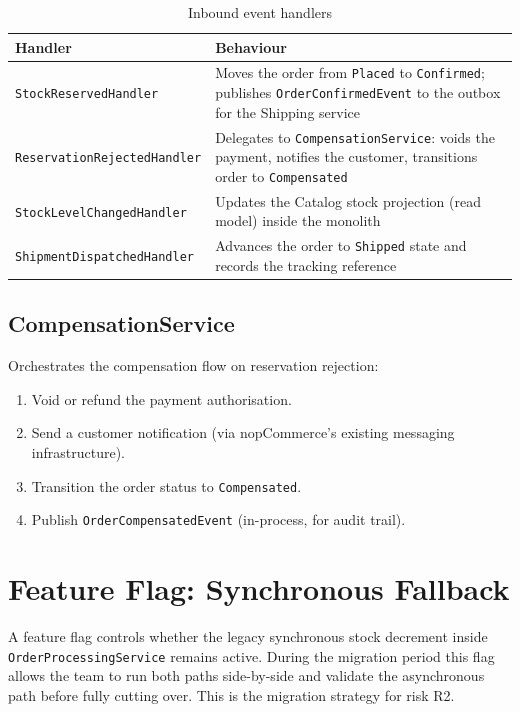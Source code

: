 \begin{table}[H]
\centering
\caption{Inbound event handlers}
\label{tab:handlers}
\small
\begin{tabularx}{\textwidth}{@{} L{5.5cm} X @{}}
\toprule
\textbf{Handler} & \textbf{Behaviour} \\
\midrule
\texttt{Stock\-Reserved\-Handler} & Moves the order from \texttt{Placed} to \texttt{Confirmed}; publishes \texttt{Order\-Confirmed\-Event} to the outbox for the Shipping service \\
\addlinespace
\texttt{Reservation\-Rejected\-Handler} & Delegates to \texttt{Compensation\-Service}: voids the payment, notifies the customer, transitions order to \texttt{Compensated} \\
\addlinespace
\texttt{Stock\-Level\-Changed\-Handler} & Updates the Catalog stock projection (read model) inside the monolith \\
\addlinespace
\texttt{Shipment\-Dispatched\-Handler} & Advances the order to \texttt{Shipped} state and records the tracking reference \\
\bottomrule
\end{tabularx}
\end{table}

\subsection{CompensationService}

Orchestrates the compensation flow on reservation rejection:
\begin{enumerate}
    \item Void or refund the payment authorisation.
    \item Send a customer notification (via nopCommerce's existing messaging infrastructure).
    \item Transition the order status to \texttt{Compensated}.
    \item Publish \texttt{OrderCompensatedEvent} (in-process, for audit trail).
\end{enumerate}

\section{Feature Flag: Synchronous Fallback}

A feature flag controls whether the legacy synchronous stock decrement inside \texttt{OrderProcessingService} remains active. During the migration period this flag allows the team to run both paths side-by-side and validate the asynchronous path before fully cutting over. This is the migration strategy for risk R2.
